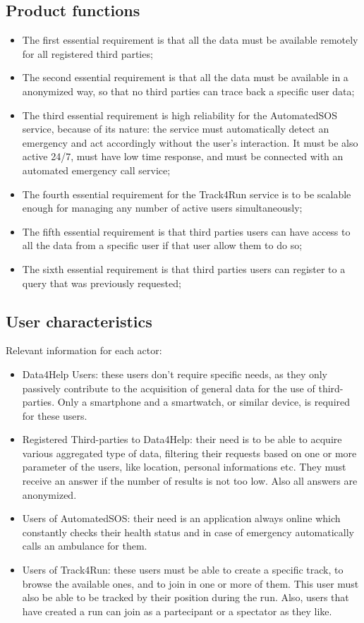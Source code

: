 {\color{secblue}\subsection{Product functions}}
\begin{itemize}
\item The first essential requirement is that all the data must be available remotely for all registered third parties;
\item The second essential requirement is that all the data must be available in a anonymized way, so that no third parties can trace back a specific user data;
\item The third essential requirement is high reliability for the AutomatedSOS service, because of its nature: the service must automatically detect an emergency and act accordingly without the user's interaction. It must be also active 24/7, must have low time response, and must be connected with an automated emergency call service;
\item The fourth essential requirement for the Track4Run service is to be scalable enough for managing any number of active users simultaneously;
\item The fifth essential requirement is that third parties users can have access to all the data from a specific user if that user allow them to do so;
\item The sixth essential requirement is that third parties users can register to a query that was previously requested;
\end{itemize}
{\color{secblue}\subsection{User characteristics}}
Relevant information for each actor:
\begin{itemize}
\item Data4Help Users: these users don't require specific needs, as they only passively contribute to the acquisition of general data for the use of third-parties. Only a smartphone and a smartwatch, or similar device, is required for these users.
\item Registered Third-parties to Data4Help: their need is to be able to acquire various aggregated type of data, filtering their requests based on one or more parameter of the users, like location, personal informations etc. They must receive an answer if the number of results is not too low. Also all answers are anonymized.
\item Users of AutomatedSOS: their need is an application always online which constantly checks their health status and in case of emergency automatically calls an ambulance for them.
\item Users of Track4Run: these users must be able to create a specific track, to browse the available ones, and to join in one or more of them. This user must also be able to be tracked by their position during the run. Also, users that have created a run can join as a partecipant or a spectator as they like.
\end{itemize}
